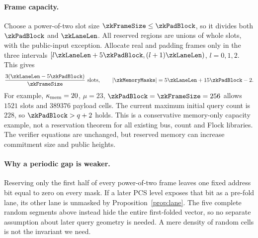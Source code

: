 \paragraph{Frame capacity.} Choose a power-of-two slot size $\zkFrameSize\le\zkPadBlock$, so it divides both $\zkPadBlock$ and $\zkLaneLen$. All reserved regions are unions of whole slots, with the public-input exception. Allocate real and padding frames only in the three intervals $[l\zkLaneLen+5\zkPadBlock,(l+1)\zkLaneLen)$, $l=0,1,2$. This gives
\[
 \frac{3(\zkLaneLen-5\zkPadBlock)}{\zkFrameSize}\ \text{slots},
 \qquad |\zkMemoryMasks|=5\zkLaneLen+15\zkPadBlock-2.
\]
For example, $\kappa_{\mathrm{mem}}=20$, $\mu=23$, $\zkPadBlock=\zkFrameSize=256$ allows $1521$ slots and $389376$ payload cells. The current maximum initial query count is $228$, so $\zkPadBlock>q+2$ holds. This is a conservative memory-only capacity example, not a reservation theorem for all existing bus, count and Flock libraries. The verifier equations are unchanged, but reserved memory can increase commitment size and public heights.

\paragraph{Why a periodic gap is weaker.} Reserving only the first half of every power-of-two frame leaves one fixed address bit equal to zero on every mask. If a later PCS level exposes that bit as a pre-fold lane, its other lane is unmasked by Proposition~\ref{prop:lane}. The five complete random segments above instead hide the entire first-folded vector, so no separate assumption about later query geometry is needed. A mere density of random cells is not the invariant we need.

